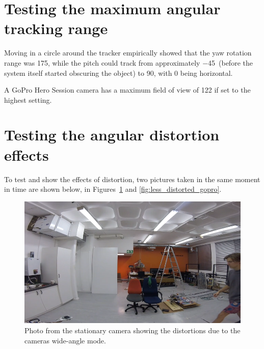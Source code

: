\section{Testing the maximum angular tracking range}
Moving in a circle around the tracker empirically showed that the yaw rotation range was 175\textdegree, while the pitch could track from approximately $-$45\textdegree\ (before the system itself started obscuring the object) to 90\textdegree{}, with 0\textdegree{} being horizontal.

A GoPro Hero Session camera has a maximum field of view of 122\textdegree{} if set to the highest setting.


\section{Testing the angular distortion effects}
To test and show the effects of distortion, two pictures taken in the same moment in time are shown below, in Figures~\ref{fig:distorted_gopro} and \ref{fig:less_distorted_gopro}.

\begin{figure}[h!]
  \centering
  \includegraphics[width=\textwidth]{results/distorted_gopro}
  \caption{\label{fig:distorted_gopro}Photo from the stationary camera showing the distortions due to the cameras wide-angle mode.}
\end{figure}

